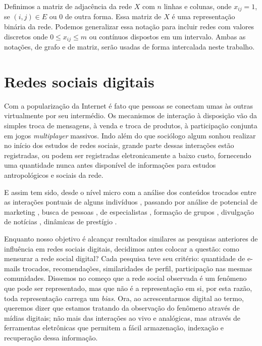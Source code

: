 Definimos a matriz de adjacência da rede $X$ com $n$ linhas e colunas, onde
$x_{ij} = 1$, se $(i,j) \in E$ ou 0 de outra forma. Essa matriz de $X$ é uma
representação binária da rede. Podemos generalizar essa notação para incluir
redes com valores discretos onde $0 \leq x_{ij} \leq m$ ou contínuos dispostos em
um intervalo. Ambas as notações, de grafo e de matriz, serão usadas de forma
intercalada neste trabalho.

\section{Redes sociais digitais}
\label{sec:redes_dig}
Com a popularização da Internet é fato que pessoas se conectam umas às outras
virtualmente por seu intermédio. Os mecanismos de interação à disposição vão da
simples troca de mensagens, à venda e troca de produtos, à participação conjunta
em jogos \textit{multiplayer} massivos. Indo além do que sociólogo algum sonhou
realizar no início dos estudos de redes sociais, grande parte dessas interações
estão registradas, ou podem ser registradas eletronicamente a baixo custo,
fornecendo uma quantidade nunca antes disponível de informações para
estudos antropológicos e sociais da rede.

E assim tem sido, desde o nível micro com a análise dos conteúdos trocados entre
as interações pontuais de alguns indivíduos \citep{Recuero2008}, passando por
análise de potencial de marketing \citep{Clemons2007, Domingos2001,
Richardson2002, Ma2008}, busca de pessoas \citep{ADAMIC2005}, de especialistas
\citep{Ehrlich2007}, formação de grupos \citep{Adamic2003, Backstrom2006,
Kumar2006}, divulgação de notícias \citep{Gruhl2004}, dinâmicas de prestígio
\citep{Salganik2006, Song2007}.

Enquanto nosso objetivo é alcançar resultados similares as pesquisas anteriores
de influência em redes sociais digitais, decidimos antes colocar a questão: como
mensurar a rede social digital? Cada pesquisa teve seu critério: quantidade de
e-mails trocados, recomendações, similaridades de perfil, participação nas mesmas
comunidades. Dissemos no começo que a rede social observada é um fenômeno que
pode ser representado, mas que não é a representação em si, por esta razão, toda
representação carrega um \emph{bias}. Ora, ao acrescentarmos digital ao termo,
queremos dizer que estamos tratando da observação do fenômeno através de mídias
digitais; não mais das interações ao vivo e analógicas, mas através de
ferramentas eletrônicas que permitem a fácil armazenação, indexação e recuperação
dessa informação.

